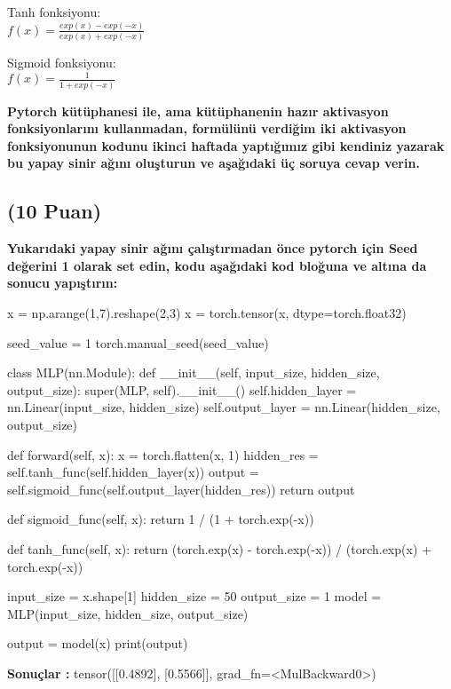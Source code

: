 \documentclass[11pt]{article}
\begin{document}
Tanh fonksiyonu:\\
$f(x) = \frac{exp(x) - exp(-x)}{exp(x) + exp(-x)}$
\vspace{.2in}

Sigmoid fonksiyonu:\\
$f(x) = \frac{1}{1 + exp(-x)}$

\vspace{.2in}
 \textbf{Pytorch kütüphanesi ile, ama kütüphanenin hazır aktivasyon fonksiyonlarını kullanmadan, formülünü verdiğim iki aktivasyon fonksiyonunun kodunu ikinci haftada yaptığımız gibi kendiniz yazarak bu yapay sinir ağını oluşturun ve aşağıdaki üç soruya cevap verin.}
 
\subsection{(10 Puan)} \textbf{Yukarıdaki yapay sinir ağını çalıştırmadan önce pytorch için Seed değerini 1 olarak set edin, kodu aşağıdaki kod bloğuna ve altına da sonucu yapıştırın:}

\begin{python}
x = np.arange(1,7).reshape(2,3)
x = torch.tensor(x, dtype=torch.float32)

seed_value = 1
torch.manual_seed(seed_value)

class MLP(nn.Module):
    def __init__(self, input_size, hidden_size, output_size):
        super(MLP, self).__init__()
        self.hidden_layer = nn.Linear(input_size, hidden_size)
        self.output_layer = nn.Linear(hidden_size, output_size)

    def forward(self, x):
        x = torch.flatten(x, 1)
        hidden_res = self.tanh_func(self.hidden_layer(x))
        output = self.sigmoid_func(self.output_layer(hidden_res))
        return output
    
    def sigmoid_func(self, x):
        return 1 / (1 + torch.exp(-x))
    
    def tanh_func(self, x):
        return (torch.exp(x) - torch.exp(-x)) / (torch.exp(x) + torch.exp(-x))

input_size = x.shape[1]
hidden_size = 50
output_size = 1
model = MLP(input_size, hidden_size, output_size)

output = model(x)
print(output)

\end{python}

\textbf{Sonuçlar :} tensor([[0.4892],
        [0.5566]], grad_fn=<MulBackward0>)
\end{document}
